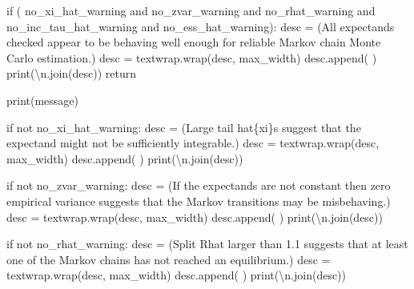 \documentclass[
  letterpaper,
  DIV=11,
  numbers=noendperiod]{scrartcl}
\newenvironment{Shaded}{\begin{snugshade}}{\end{snugshade}}
\newcommand{\BuiltInTok}[1]{\textcolor[rgb]{0.00,0.23,0.31}{#1}}
\newcommand{\CharTok}[1]{\textcolor[rgb]{0.13,0.47,0.30}{#1}}
\newcommand{\ControlFlowTok}[1]{\textcolor[rgb]{0.00,0.23,0.31}{#1}}
\newcommand{\KeywordTok}[1]{\textcolor[rgb]{0.00,0.23,0.31}{#1}}
\newcommand{\NormalTok}[1]{\textcolor[rgb]{0.00,0.23,0.31}{#1}}
\newcommand{\OperatorTok}[1]{\textcolor[rgb]{0.37,0.37,0.37}{#1}}
\newcommand{\SpecialCharTok}[1]{\textcolor[rgb]{0.37,0.37,0.37}{#1}}
\newcommand{\StringTok}[1]{\textcolor[rgb]{0.13,0.47,0.30}{#1}}
\begin{document}
\begin{Shaded}
\begin{Highlighting}[]
  \ControlFlowTok{if}\NormalTok{ (    no\_xi\_hat\_warning }\KeywordTok{and}\NormalTok{ no\_zvar\_warning}
      \KeywordTok{and}\NormalTok{ no\_rhat\_warning   }\KeywordTok{and}\NormalTok{ no\_inc\_tau\_hat\_warning}
      \KeywordTok{and}\NormalTok{ no\_ess\_hat\_warning):}
\NormalTok{    desc }\OperatorTok{=}\NormalTok{ (}\StringTok{\textquotesingle{}All expectands checked appear to be behaving well enough \textquotesingle{}}
            \StringTok{\textquotesingle{}for reliable Markov chain Monte Carlo estimation.\textquotesingle{}}\NormalTok{)}
\NormalTok{    desc }\OperatorTok{=}\NormalTok{ textwrap.wrap(desc, max\_width)}
\NormalTok{    desc.append(}\StringTok{\textquotesingle{} \textquotesingle{}}\NormalTok{)}
    \BuiltInTok{print}\NormalTok{(}\StringTok{\textquotesingle{}}\CharTok{\textbackslash{}n}\StringTok{\textquotesingle{}}\NormalTok{.join(desc))}
    \ControlFlowTok{return}

  \BuiltInTok{print}\NormalTok{(message)}

  \ControlFlowTok{if} \KeywordTok{not}\NormalTok{ no\_xi\_hat\_warning:}
\NormalTok{    desc }\OperatorTok{=}\NormalTok{ (}\StringTok{\textquotesingle{}Large tail hat}\SpecialCharTok{\{xi\}}\StringTok{s suggest that the expectand \textquotesingle{}}
            \StringTok{\textquotesingle{}might not be sufficiently integrable.\textquotesingle{}}\NormalTok{)}
\NormalTok{    desc }\OperatorTok{=}\NormalTok{ textwrap.wrap(desc, max\_width)}
\NormalTok{    desc.append(}\StringTok{\textquotesingle{} \textquotesingle{}}\NormalTok{)}
    \BuiltInTok{print}\NormalTok{(}\StringTok{\textquotesingle{}}\CharTok{\textbackslash{}n}\StringTok{\textquotesingle{}}\NormalTok{.join(desc))}

  \ControlFlowTok{if} \KeywordTok{not}\NormalTok{ no\_zvar\_warning:}
\NormalTok{    desc }\OperatorTok{=}\NormalTok{ (}\StringTok{\textquotesingle{}If the expectands are not constant then zero empirical \textquotesingle{}}
            \StringTok{\textquotesingle{}variance suggests that the Markov transitions may be \textquotesingle{}}
            \StringTok{\textquotesingle{}misbehaving.\textquotesingle{}}\NormalTok{)}
\NormalTok{    desc }\OperatorTok{=}\NormalTok{ textwrap.wrap(desc, max\_width)}
\NormalTok{    desc.append(}\StringTok{\textquotesingle{} \textquotesingle{}}\NormalTok{)}
    \BuiltInTok{print}\NormalTok{(}\StringTok{\textquotesingle{}}\CharTok{\textbackslash{}n}\StringTok{\textquotesingle{}}\NormalTok{.join(desc))}

  \ControlFlowTok{if} \KeywordTok{not}\NormalTok{ no\_rhat\_warning:}
\NormalTok{    desc }\OperatorTok{=}\NormalTok{ (}\StringTok{\textquotesingle{}Split Rhat larger than 1.1 suggests that at least one of \textquotesingle{}}
            \StringTok{\textquotesingle{}the Markov chains has not reached an equilibrium.\textquotesingle{}}\NormalTok{)}
\NormalTok{    desc }\OperatorTok{=}\NormalTok{ textwrap.wrap(desc, max\_width)}
\NormalTok{    desc.append(}\StringTok{\textquotesingle{} \textquotesingle{}}\NormalTok{)}
    \BuiltInTok{print}\NormalTok{(}\StringTok{\textquotesingle{}}\CharTok{\textbackslash{}n}\StringTok{\textquotesingle{}}\NormalTok{.join(desc))}


\end{Highlighting}
\end{Shaded}
\end{document}
